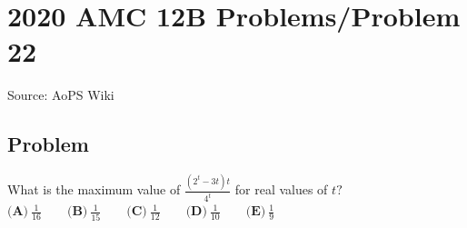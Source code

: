 \documentclass[12pt]{article}
\begin{document}
\section*{{2020 AMC 12B Problems/Problem 22}}
Source: AoPS Wiki

\subsection*{Problem}
What is the maximum value of $\frac{(2^t-3t)t}{4^t}$ for real values of $t?$ $\textbf{(A)}\ \frac{1}{16} \qquad\textbf{(B)}\ \frac{1}{15} \qquad\textbf{(C)}\ \frac{1}{12} \qquad\textbf{(D)}\ \frac{1}{10} \qquad\textbf{(E)}\ \frac{1}{9}$
\end{document}
